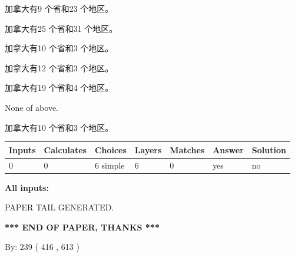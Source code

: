 \documentclass{ctexart}
\begin{document}
 
加拿大有9 个省和23 个地区。
 
 
加拿大有25 个省和31 个地区。
 
 
加拿大有10 个省和3 个地区。
 
 
加拿大有12 个省和3 个地区。
 
 
加拿大有19 个省和4 个地区。
 
 
 None of above.
 
 
\noindent{}
 
 
加拿大有10 个省和3 个地区。
 
 
\noindent{}
 
 
   
   
   
   
\noindent\begin{tabular}{|l|l|l|l|l|l|l|}
 \hline
Inputs & Calculates & Choices & Layers & Matches & Answer & Solution \\ \hline
 0  & 
 0  & 
 6
  simple  
  & 
 6  & 
 0  & 
  yes & 
  no 
  \\ \hline
 \end{tabular}
   
   
   
   
\noindent{}
   
   
   
   
\noindent\vspace{0.1in}\hspace{-0.08in} {\textbf{\Large{All inputs: }}}
   
   
   
   
   
   
 \vspace{0.2in}
 
   
   
\vspace{2.0in} PAPER TAIL GENERATED.
   
   
   
   
\vspace{1.0in} 
{\textbf{\large{ *** END OF PAPER, THANKS *** }}} 
   
   
\hspace{1.0in} By: 
 239 ( 416 ,  613 )
   
\end{document}
